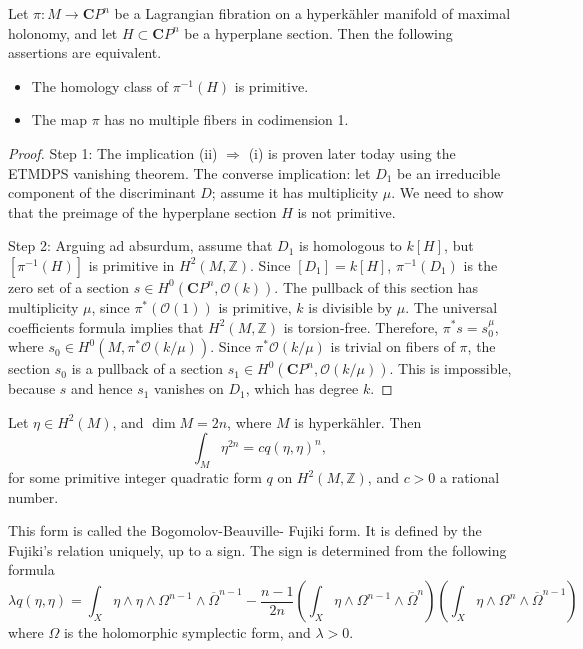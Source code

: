 \begin{lemma}
\label{lemma-primitive-classes-lagrangian}
Let \(\pi : M \to \mathbf{C}P^n\) be a
Lagrangian fibration on a hyperk\"ahler
manifold of maximal holonomy, and
let \(H \subset \mathbf{C}P^n\) be a
hyperplane section. Then the following
assertions are equivalent.
\begin{itemize}
\item The homology class of
\(\pi^{-1}(H)\) is primitive.
\item The map \(\pi\) has no multiple
fibers in codimension 1.
\end{itemize}
\end{lemma}

\begin{proof}
Step 1: The implication (ii) \(\Rightarrow\)
(i) is proven later today using the ETMDPS
vanishing theorem. The converse implication:
let \(D_1\) be an irreducible component of
the discriminant \(D\); assume it has
multiplicity \(\mu\). We need to show that
the preimage of the hyperplane section \(H\)
is not primitive.

Step 2: Arguing ad absurdum, assume that
\(D_1\) is homologous to \(k[H]\), but
\([\pi^{-1}(H)]\) is primitive in
\(H^2(M,\mathbb{Z})\). Since
\([D_1] = k[H]\), \(\pi^{-1}(D_1)\) is the
zero set of a section
\(s \in H^0(\mathbf{C}P^n,\mathcal{O}(k))\).
The pullback of this section has multiplicity
\(\mu\), since \(\pi^*(\mathcal{O}(1))\) is
primitive, \(k\) is divisible by \(\mu\).
The universal coefficients formula implies
that \(H^2(M,\mathbb{Z})\) is torsion-free.
Therefore, \(\pi^*s = s_0^\mu\), where
\(s_0 \in H^0(M,\pi^*\mathcal{O}(k/\mu))\).
Since \(\pi^*\mathcal{O}(k/\mu)\) is
trivial on fibers of \(\pi\), the section
\(s_0\) is a pullback of a section
\(s_1 \in H^0(\mathbf{C}P^n,\mathcal{O}(k/\mu))\).
This is impossible, because \(s\) and hence
\(s_1\) vanishes on \(D_1\), which has
degree \(k\).
\end{proof}

\begin{theorem}[Fujiki]
\label{theorem-fujiki}
Let \(\eta \in H^2(M)\), and \(\dim M = 2n\),
where \(M\) is hyperk\"ahler. Then
\[
\int_M \eta^{2n} = cq(\eta,\eta)^n,
\]
for some primitive integer quadratic form
\(q\) on \(H^2(M,\mathbb{Z})\), and
\(c>0\) a rational number.
\end{theorem}

\begin{definition}
\label{definition-bbf-form}
This form is called the Bogomolov-Beauville-
Fujiki form. It is defined by the Fujiki's
relation uniquely, up to a sign. The sign is
determined from the following formula
\[
\lambda q(\eta,\eta)=
\int_X \eta \wedge \eta \wedge \Omega^{n-1}
\wedge \overline{\Omega}^{n-1}
- \frac{n-1}{2n}
\left(
\int_X \eta \wedge \Omega^{n-1}
\wedge \overline{\Omega}^{n}
\right)
\left(
\int_X \eta \wedge \Omega^{n}
\wedge \overline{\Omega}^{n-1}
\right)
\]
where \(\Omega\) is the holomorphic symplectic
form, and \(\lambda>0\).
\end{definition}


